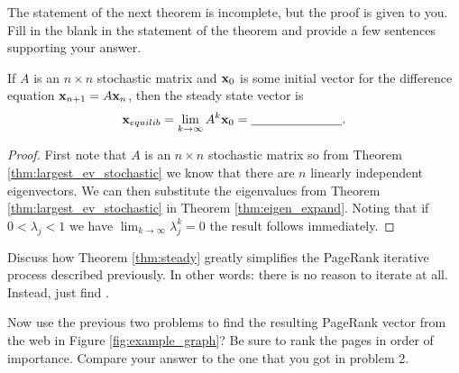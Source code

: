 The statement of the next theorem is incomplete, but the proof is given to you.  Fill in
the blank in the statement of the theorem and provide a few sentences supporting your
answer.
\begin{thm}\label{thm:steady}
    If $A$ is an $n \times n$ stochastic matrix and ${\bf x}_0$ is some initial vector
    for the difference equation ${\bf x}_{n+1} = A {\bf x}_n$, then the steady state
    vector is
    \[ {\bf x}_{equilib} = \lim_{k \to\infty} A^k {\bf x}_0 = \underline{\hspace{1in}}. \]
\end{thm}
\begin{proof}
    First note that $A$ is an $n \times n$ stochastic matrix so from Theorem
    \ref{thm:largest_ev_stochastic} we know that there are $n$ linearly
    independent eigenvectors.  We can then substitute
    the eigenvalues from Theorem \ref{thm:largest_ev_stochastic} in Theorem
    \ref{thm:eigen_expand}. Noting that if $0<\lambda_j<1$ we have $\lim_{k \to
    \infty} \lambda_j^k = 0$ the result follows immediately.
\end{proof}
\begin{problem}
    Discuss how Theorem \ref{thm:steady} greatly simplifies the PageRank iterative process
    described previously.  In other words: there is no reason to iterate at all.  Instead,
    just find \underline{\hspace{1in}}.
\end{problem}
\begin{problem}
\item Now use the previous two problems to find the resulting PageRank vector from the web in Figure
    \ref{fig:example_graph}?  Be sure to rank the pages in order of importance.
    Compare your answer to the one that you got in problem 2.
\end{problem}


